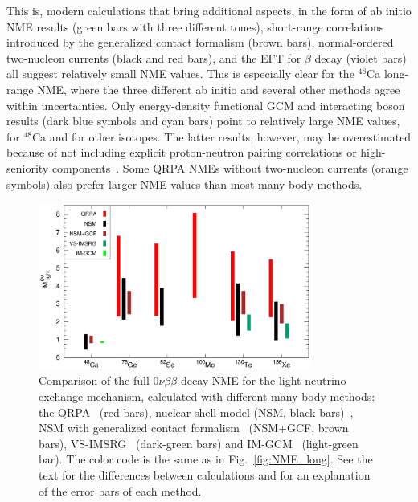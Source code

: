This is, modern calculations that bring additional aspects, in the form of ab initio NME results (green bars with three different tones), short-range correlations introduced by the generalized contact formalism (brown bars), normal-ordered two-nucleon currents (black and red bars), and the EFT for $\beta$ decay (violet bars) all suggest relatively small NME values. This is especially clear for the $^{48}$Ca long-range NME, where the three different ab initio and several other methods agree within uncertainties. Only energy-density functional GCM and interacting boson results (dark blue symbols and cyan bars) point to relatively large NME values, for $^{48}$Ca and for other isotopes. The latter results, however, may be overestimated because of not including explicit proton-neutron pairing correlations or high-seniority components~\cite{Menendez:2014ena,Hinohara:2014lqa,Menendez:2015kxa}. Some QRPA NMEs without two-nucleon currents (orange symbols) also prefer larger NME values than most many-body methods. 

\begin{figure}[t]
	\begin{center}
	\includegraphics[width=0.8\textwidth]{img/nme_total_2023.eps}
	\caption{Comparison of the full $0\nu\beta\beta$-decay NME for the light-neutrino exchange mechanism, calculated with different many-body methods: the QRPA~\cite{Jokiniemi:2022ayc} (red bars), nuclear shell model (NSM, black bars)~\cite{Jokiniemi:2022ayc}, NSM with generalized contact formalism~\cite{Weiss:2021rig} (NSM+GCF, brown bars), VS-IMSRG~\cite{Belley:2023btr} (dark-green bars) and IM-GCM~\cite{Wirth:2021pij} (light-green bar). The color code is the same as in Fig.~\ref{fig:NME_long}. See the text for the differences between calculations and for an explanation of the error bars of each method.\label{fig:NME_full}
	}
\end{center}
\end{figure}

